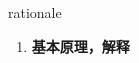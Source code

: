 
\begin{frame}
{\huge rationale}
\begin{center}
\begin{enumerate}\Large
  \item \textbf{基本原理，解释}
\end{enumerate}
\end{center}
\end{frame}
